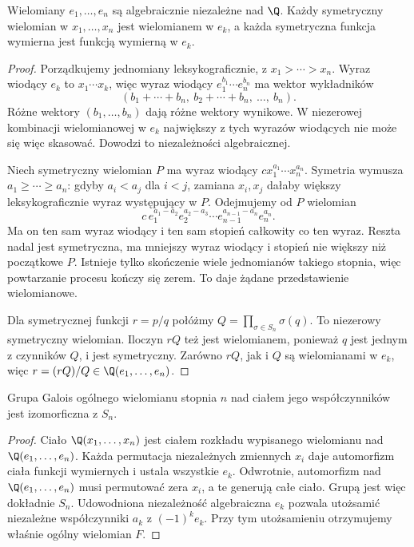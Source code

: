 \begin{lemat}
Wielomiany $e_1,\dots,e_n$ są algebraicznie niezależne nad $\Q$. Każdy symetryczny wielomian w $x_1,\dots,x_n$ jest wielomianem w $e_k$, a każda symetryczna funkcja wymierna jest funkcją wymierną w $e_k$.
\end{lemat}
\begin{proof}
Porządkujemy jednomiany leksykograficznie, z $x_1>\cdots>x_n$. Wyraz wiodący $e_k$ to $x_1\cdots x_k$, więc wyraz wiodący $e_1^{b_1}\cdots e_n^{b_n}$ ma wektor wykładników
\[
(b_1+\cdots+b_n,\ b_2+\cdots+b_n,\ \dots,\ b_n).
\]
Różne wektory $(b_1,\dots,b_n)$ dają różne wektory wynikowe. W niezerowej kombinacji wielomianowej w $e_k$ największy z tych wyrazów wiodących nie może się więc skasować. Dowodzi to niezależności algebraicznej.

Niech symetryczny wielomian $P$ ma wyraz wiodący $c x_1^{a_1}\cdots x_n^{a_n}$. Symetria wymusza $a_1\ge\cdots\ge a_n$: gdyby $a_i<a_j$ dla $i<j$, zamiana $x_i,x_j$ dałaby większy leksykograficznie wyraz występujący w $P$. Odejmujemy od $P$ wielomian
\[
c\,e_1^{a_1-a_2}e_2^{a_2-a_3}\cdots e_{n-1}^{a_{n-1}-a_n}e_n^{a_n}.
\]
Ma on ten sam wyraz wiodący i ten sam stopień całkowity co ten wyraz. Reszta nadal jest symetryczna, ma mniejszy wyraz wiodący i stopień nie większy niż początkowe $P$. Istnieje tylko skończenie wiele jednomianów takiego stopnia, więc powtarzanie procesu kończy się zerem. To daje żądane przedstawienie wielomianowe.

Dla symetrycznej funkcji $r=p/q$ połóżmy $Q=\prod_{\sigma\in S_n}\sigma(q)$. To niezerowy symetryczny wielomian. Iloczyn $rQ$ też jest wielomianem, ponieważ $q$ jest jednym z czynników $Q$, i jest symetryczny. Zarówno $rQ$, jak i $Q$ są wielomianami w $e_k$, więc $r=(rQ)/Q\in\Q(e_1,\dots,e_n)$.
\end{proof}

\begin{wniosek}
Grupa Galois ogólnego wielomianu stopnia $n$ nad ciałem jego współczynników jest izomorficzna z $S_n$.
\end{wniosek}
\begin{proof}
Ciało $\Q(x_1,\dots,x_n)$ jest ciałem rozkładu wypisanego wielomianu nad $\Q(e_1,\dots,e_n)$. Każda permutacja niezależnych zmiennych $x_i$ daje automorfizm ciała funkcji wymiernych i ustala wszystkie $e_k$. Odwrotnie, automorfizm nad $\Q(e_1,\dots,e_n)$ musi permutować zera $x_i$, a te generują całe ciało. Grupą jest więc dokładnie $S_n$. Udowodniona niezależność algebraiczna $e_k$ pozwala utożsamić niezależne współczynniki $a_k$ z $(-1)^ke_k$. Przy tym utożsamieniu otrzymujemy właśnie ogólny wielomian $F$.
\end{proof}

